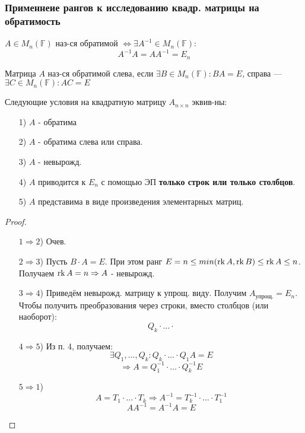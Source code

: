 \subsubsection{Применнеие рангов к исследованию квадр. матрицы на обратимость}
\begin{definition}
  $A \in M_n(\mathbb{F})$ наз-ся обратимой $\iff \exists A^{-1} \in M_n(\mathbb{F}) \colon$
  \[
  A^{-1}A = A A^{-1} = E_n
  \]
\end{definition}
\begin{definition}
Матрица $A$ наз-ся обратимой слева, если $\exists B \in M_n(\mathbb{F})\colon BA = E$, справа --- $\exists C \in M_n(\mathbb{F}) \colon AC = E$
\end{definition}
\begin{theorem}
Следующие условия на квадратную матрицу $A_{n\times n}$ эквив-ны:
\begin{itemize}
  \item [1) ] $A$ - обратима
  \item [2) ] $A$ - обратима слева или справа.
  \item [3) ] $A$ - невырожд.
  \item [4) ] $A$ приводится к $E_n$ с помощью ЭП \textbf{только строк или только столбцов}.
  \item [5) ] $A$ представима в виде произведения элементарных матриц.
\end{itemize}
\end{theorem}
\begin{proof}
  ~\newline
\begin{itemize}
  \item [$1 \Rightarrow 2$)] Очев.
  \item [$2 \Rightarrow 3$)] Пусть $B \cdot A = E$. При этом ранг $E = n \leq min(\operatorname{rk} A, \operatorname{rk} B) \leq \operatorname{rk} A \leq n$. Получаем $\operatorname{rk} A = n \Rightarrow A$ - невырожд.
  \item [$3 \Rightarrow 4$)] Приведём невырожд. матрицу к упрощ. виду. Получим $A_{\text{упрощ.}} = E_n$. Чтобы получить преобразования через строки, вместо столбцов (или наоборот):
    \[
    Q_k \cdot \ldots \cdot 
    \]
  \item [$4 \Rightarrow 5$)] Из п. 4, получаем:
    \[
    \exists Q_1, \ldots, Q_k \colon Q_k \cdot \ldots \cdot Q_1 A = E
    \]
    \[
\Rightarrow    A = Q_1^{-1} \cdot \ldots \cdot Q_k^{-1}E 
    \]
  \item [$5 \Rightarrow 1$)] \[
      A = T_1 \cdot \ldots \cdot T_k \Rightarrow A^{-1} = T_k^{-1} \cdot \ldots \cdot T_1^{-1}
  \]
  \[
  A A^{-1} = A^{-1} A = E
  \]
\end{itemize}
\end{proof}

